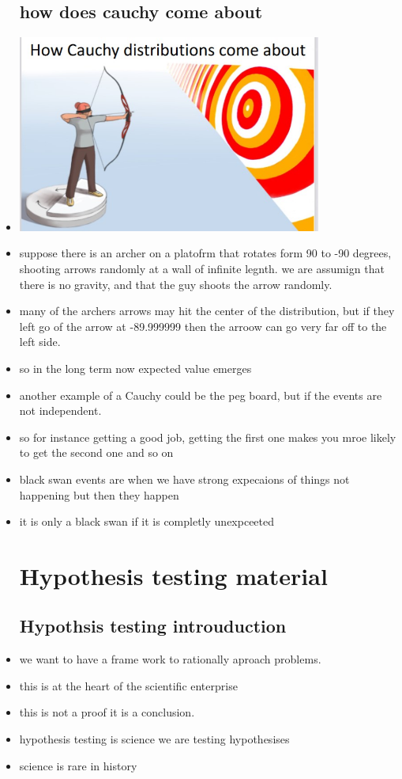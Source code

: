 \documentclass{article}
\begin{document}
\begin{itemize}
\subsection{how does cauchy come about}
\item \includegraphics[width=10cm]{Final_Review/lecture_3/cauchy_archer.jpg} 
\item suppose there is an archer on a platofrm that rotates form 90 to -90 degrees, shooting arrows randomly at a wall of infinite legnth. we are assumign that there is no gravity, and that the guy shoots the arrow randomly.  
\item many of the archers arrows may hit the center of the distribution, but if they left go of the arrow at -89.999999 then the arroow can go very far off to the left side. 
\item so in the long term now expected value emerges
\item another example of a Cauchy could be the peg board, but if the events are not independent. 
\item so for instance getting a good job, getting the first one makes you mroe likely to get the second one and so on  
\item black swan events are when we have strong expecaions of things not happening but then they happen 
\item it is only a black swan if it is completly unexpceeted 
\section{Hypothesis testing material}
\subsection{Hypothsis testing introuduction }
\item we want to have a frame work to rationally aproach problems. 
\item this is at the heart of the scientific enterprise
\item this is not a proof it is a conclusion. 
\item hypothesis testing is science
\itme we are testing hypothesises 
\item science is rare in history 

\end{itemize}
\end{document}
